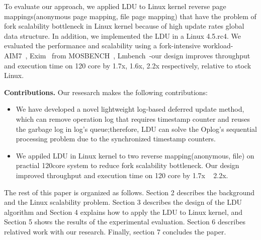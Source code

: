 To evaluate our approach, we applied LDU to Linux kernel reverse
page mappings(anonymous page mapping, file page mapping) that have the
problem of fork scalability bottleneck in Linux kernel because of
high update rates global data structure.
In addition, we implemented the LDU in a Linux 4.5.rc4.
We evaluated the performance and scalability using a fork-intensive workload-
AIM7~\cite{AIM7Benchmark}, Exim~\cite{Exim} from MOSBENCH~\cite{MOSBENCH},
Lmbench~\cite{mcvoy1996lmbench}-our design improves throughput and execution
time on 120 core by 1.7x, 1.6x, 2.2x respectively, relative to stock Linux.


\textbf{Contributions.} Our resesarch makes the following contributions:
\begin{itemize}
\item We have developed a novel lightweight log-based deferred update method,
which can remove operation log that requires timestamp counter and reuses
the garbage log in log's queue;therefore, LDU can solve the Oplog's sequential processing problem due to the synchronized timestamp counters.
\item 
We appiled LDU in Linux kernel to two reverse mapping(anonymous, file) on
practial 120core system to reduce fork scalability bottleneck.
Our design improved throughput and execution time on 120 core by 1.7x ~ 2.2x.
\end{itemize}


The rest of this paper is organized as follows.
Section 2 describes the background and the Linux scalability problem.
Section 3 describes the design of the LDU algorithm and 
Section 4 explains how to apply the LDU to Linux kernel, and
Section 5 shows the results of the experimental evaluation. 
Section 6 describes relatived work with our research.
Finally, section 7 concludes the paper.
